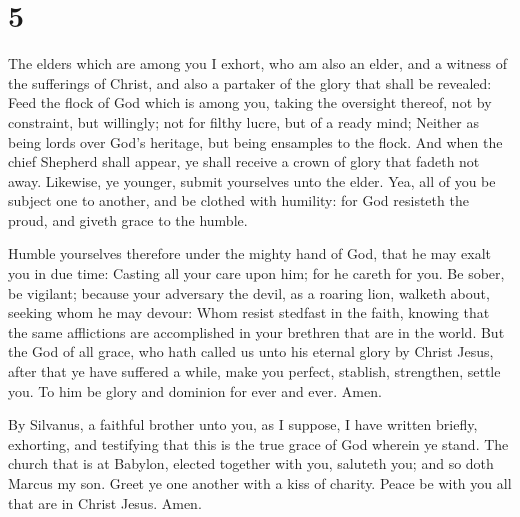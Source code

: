\hypertarget{section-4}{%
\section{5}\label{section-4}}

 The elders which are among you I exhort, who am also an
elder, and a witness of the sufferings of Christ, and also a partaker of
the glory that shall be revealed:  Feed the flock of God
which is among you, taking the oversight thereof, not by constraint, but
willingly; not for filthy lucre, but of a ready mind; 
Neither as being lords over God's heritage, but being ensamples to the
flock.  And when the chief Shepherd shall appear, ye shall
receive a crown of glory that fadeth not away.  Likewise, ye
younger, submit yourselves unto the elder. Yea, all of you be subject
one to another, and be clothed with humility: for God resisteth the
proud, and giveth grace to the humble.

 Humble yourselves therefore under the mighty hand of God,
that he may exalt you in due time:  Casting all your care
upon him; for he careth for you.  Be sober, be vigilant;
because your adversary the devil, as a roaring lion, walketh about,
seeking whom he may devour:  Whom resist stedfast in the
faith, knowing that the same afflictions are accomplished in your
brethren that are in the world.  But the God of all grace,
who hath called us unto his eternal glory by Christ Jesus, after that ye
have suffered a while, make you perfect, stablish, strengthen, settle
you.  To him be glory and dominion for ever and ever. Amen.

 By Silvanus, a faithful brother unto you, as I suppose, I
have written briefly, exhorting, and testifying that this is the true
grace of God wherein ye stand.  The church that is at
Babylon, elected together with you, saluteth you; and so doth Marcus my
son.  Greet ye one another with a kiss of charity. Peace be
with you all that are in Christ Jesus. Amen.
